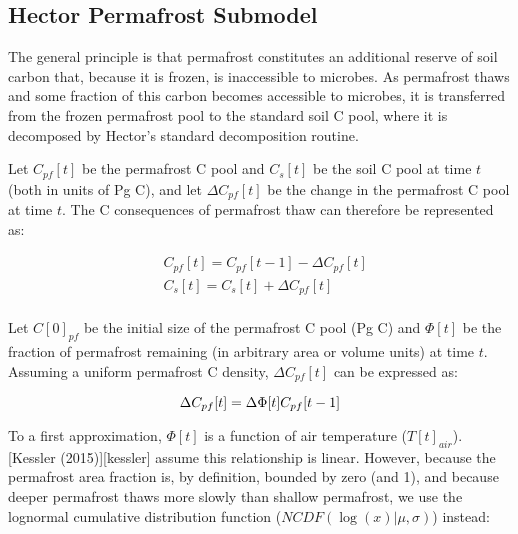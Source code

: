 \documentclass[essd, manuscript]{copernicus}
\begin{document}
\subsection{Hector Permafrost Submodel}
The general principle is that permafrost constitutes an additional reserve of soil carbon that, because it is frozen, is inaccessible to microbes. As permafrost thaws and some fraction of this carbon becomes accessible to microbes, it is transferred from the frozen permafrost pool to the standard soil C pool, where it is decomposed by Hector's standard decomposition routine.

Let $C_{pf}[t]$ be the permafrost C pool and $C_{s}[t]$ be the soil C pool at time $t$ (both in units of Pg C), and let $\Delta C_{pf}[t]$ be the change in the permafrost C pool at time $t$.
The C consequences of permafrost thaw can therefore be represented as:

\begin{align*}
&C_{pf}[t] = C_{pf}[t-1] - \Delta C_{pf}[t]\\
&C_{s}[t] = C_{s}[t] + \Delta C_{pf}[t]\\
\end{align*}

Let $C[0]_{pf}$ be the initial size of the permafrost C pool (Pg C) and $\Phi[t]$ be the fraction of permafrost remaining (in arbitrary area or volume units) at time $t$.
Assuming a uniform permafrost C density, $\Delta C_{pf}[t]$ can be expressed as:

\begin{equation*} 
\Delta C_{pf}[t] = \Delta \Phi[t] C_{pf}[t-1]\\
\end{equation*}

To a first approximation, $\Phi[t]$ is a function of air temperature ($T[t]_{air}$).
[Kessler (2015)][kessler] assume this relationship is linear.
However, because the permafrost area fraction is, by definition, bounded by zero (and 1\footnotemark), and because deeper permafrost thaws more slowly than shallow permafrost, we use the lognormal cumulative distribution function ($NCDF(\log(x) | \mu, \sigma)$) instead:

\end{document}
